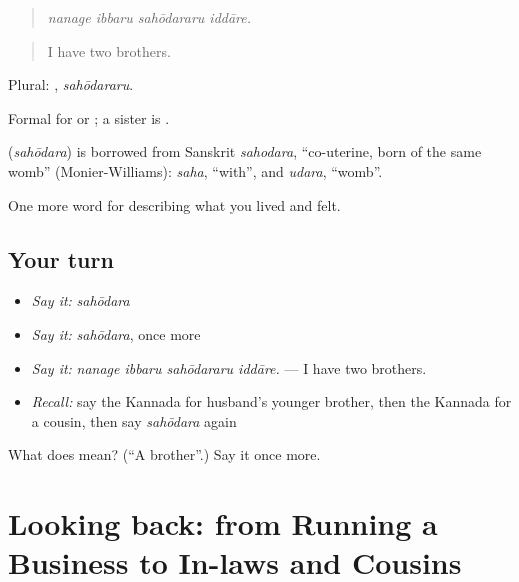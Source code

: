 \begin{quote}
\emph{nanage ibbaru sahōdararu iddāre.}
\end{quote}

\begin{quote}
I have two brothers.
\end{quote}

Plural: , \emph{sahōdararu}.

Formal for  or ; a sister is .

\begin{cousinweb}
\textbf{} (\emph{sahōdara}) is borrowed from Sanskrit \emph{sahodara}, \textquotedblleft{}co-uterine, born of the same womb\textquotedblright{} (Monier-Williams): \emph{saha}, \textquotedblleft{}with\textquotedblright{}, and \emph{udara}, \textquotedblleft{}womb\textquotedblright{}.
\end{cousinweb}

\begin{grammarlens}[title={What you've built}]
One more word for describing what you lived and felt.
\end{grammarlens}

\subsection*{Your turn}
\begin{itemize}
\raggedright
  \item \emph{Say it:} \emph{sahōdara}
  \item \emph{Say it:} \emph{sahōdara}, once more
  \item \emph{Say it:} \emph{nanage ibbaru sahōdararu iddāre.} — I have two brothers.
  \item \emph{Recall:} say the Kannada for husband's younger brother, then the Kannada for a cousin, then say \emph{sahōdara} again
\end{itemize}

\begin{tcolorbox}[breakable,colback=teal!4,colframe=teal!35!black,title={Before you move on}]
What does  mean? (\textquotedblleft{}A brother\textquotedblright{}.) Say it once more.
\end{tcolorbox}
\section[(dialogue)]{Looking back: from Running a Business to In-laws and Cousins}

